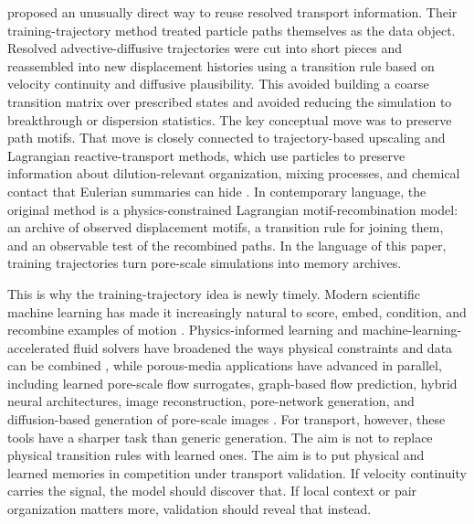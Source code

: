 \documentclass[11pt]{article}
\begin{document}
\citet{Most2019} proposed an unusually direct way to reuse resolved transport information. Their training-trajectory method treated particle paths themselves as the data object. Resolved advective-diffusive trajectories were cut into short pieces and reassembled into new displacement histories using a transition rule based on velocity continuity and diffusive plausibility. This avoided building a coarse transition matrix over prescribed states and avoided reducing the simulation to breakthrough or dispersion statistics. The key conceptual move was to preserve path motifs. That move is closely connected to trajectory-based upscaling and Lagrangian reactive-transport methods, which use particles to preserve information about dilution-relevant organization, mixing processes, and chemical contact that Eulerian summaries can hide \citep{Sund2017,Paster2013,Bolster2016,BensonBolster2016,Engdahl2017}. In contemporary language, the original method is a physics-constrained Lagrangian motif-recombination model: an archive of observed displacement motifs, a transition rule for joining them, and an observable test of the recombined paths. In the language of this paper, training trajectories turn pore-scale simulations into memory archives.

This is why the training-trajectory idea is newly timely. Modern scientific machine learning has made it increasingly natural to score, embed, condition, and recombine examples of motion \citep{Ho2020,Li2021,Lu2021,Song2021,SanchezGonzalez2020,Toshev2023}. Physics-informed learning and machine-learning-accelerated fluid solvers have broadened the ways physical constraints and data can be combined \citep{Raissi2019,Karniadakis2021,Kochkov2021}, while porous-media applications have advanced in parallel, including learned pore-scale flow surrogates, graph-based flow prediction, hybrid neural architectures, image reconstruction, pore-network generation, and diffusion-based generation of pore-scale images \citep{FuksTchelepi2020,Mosser2017,Wang2021,Kashefi2023,Alzahrani2023,Delpisheh2024,Guo2024PoreNetwork,Sathujoda2024,Yang2024,Zhang2024HybridPNM,Zhao2025HybridNN,Srikanth2025,Zhu2025}. For transport, however, these tools have a sharper task than generic generation. The aim is not to replace physical transition rules with learned ones. The aim is to put physical and learned memories in competition under transport validation. If velocity continuity carries the signal, the model should discover that. If local context or pair organization matters more, validation should reveal that instead.
\end{document}
